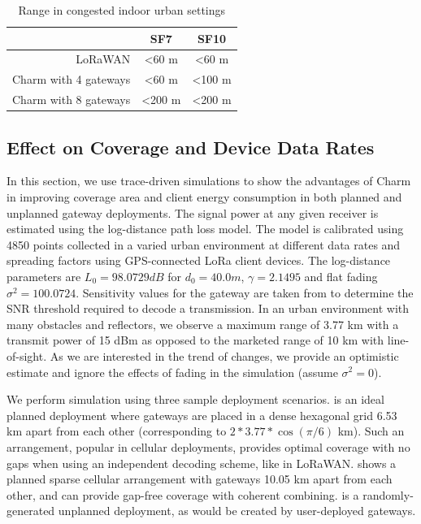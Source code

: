 \begin{table}[t]
\centering
\begin{tabular}{r|c|c|}
\cline{2-3}
\multicolumn{1}{l|}{}            & SF7            & SF10           \\ \hline
\multicolumn{1}{|r|}{LoRaWAN}       & \textless60 m  & \textless60 m  \\ \hline
\multicolumn{1}{|r|}{Charm with 4 gateways} & \textless60 m  & \textless100 m \\ \hline
\multicolumn{1}{|r|}{Charm with 8 gateways} & \textless200 m & \textless200 m \\ \hline
\end{tabular}
\caption{Range in congested indoor urban settings}
\label{tab:range}
\compactimg
\compactimg
\end{table}

\subsection{Effect on Coverage and Device Data Rates}
\label{sec:coverage-data-rate-improvement}

In this section, we use trace-driven simulations to show the advantages of
Charm in improving coverage area and client energy consumption in both planned
and unplanned gateway deployments. The signal power at any given receiver is
estimated using the log-distance path loss model. The model is calibrated
using 4850 points collected in a varied urban environment at different data
rates and spreading factors using GPS-connected LoRa client devices. The
log-distance parameters are $L_0  = 98.0729 dB$ for $d_0 = 40.0 m$, $\gamma =
2.1495$ and flat fading $\sigma^2 = 100.0724$. Sensitivity values for the
gateway are taken from \cite{Bor2016} to determine the SNR threshold required
to decode a transmission. In an urban environment with many obstacles and
reflectors, we observe a maximum range of 3.77 km with a transmit power of 15
dBm as opposed to the marketed range of 10 km with line-of-sight. As we are
interested in the trend of changes, we provide an optimistic estimate and
ignore the effects of fading in the simulation (assume $\sigma^2 = 0$).

We perform simulation using three sample deployment scenarios.
 is an ideal planned deployment where gateways
are placed in a dense hexagonal grid 6.53 km apart from each other
(corresponding to $2*3.77*\cos(\pi/6)$ km). Such an arrangement, popular in
cellular deployments, provides optimal coverage with no gaps when using an
independent decoding scheme, like in LoRaWAN. 
shows a planned sparse cellular arrangement with gateways 10.05 km apart from
each other, and can provide gap-free coverage with coherent combining.
 is a randomly-generated unplanned deployment, as
would be created by user-deployed gateways.


